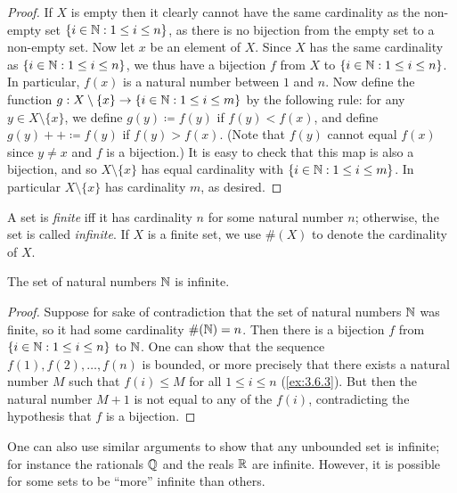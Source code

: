 \begin{proof}
  If \(X\) is empty then it clearly cannot have the same cardinality as the non-empty set \(\{i \in \mathbb{N} : 1 \leq i \leq n\}\), as there is no bijection from the empty set to a non-empty set.
  Now let \(x\) be an element of \(X\).
  Since \(X\) has the same cardinality as \(\{i \in \mathbb{N} : 1 \leq i \leq n\}\), we thus have a bijection \(f\) from \(X\) to \(\{i \in \mathbb{N} : 1 \leq i \leq n\}\).
  In particular, \(f(x)\) is a natural number between \(1\) and \(n\).
  Now define the function \(g : X \setminus \{x\} \to \{i \in \mathbb{N} : 1 \leq i \leq m\}\) by the following rule: for any \(y \in X \setminus \{x\}\), we define \(g(y) \coloneqq f(y)\) if \(f(y) < f(x)\), and define \(g(y)++ \coloneqq f(y)\) if \(f(y) > f(x)\).
  (Note that \(f(y)\) cannot equal \(f(x)\) since \(y \neq x\) and \(f\) is a bijection.)
  It is easy to check that this map is also a bijection, and so \(X \setminus \{x\}\) has equal cardinality with \(\{i \in \mathbb{N} : 1 \leq i \leq m\}\).
  In particular \(X \setminus \{x\}\) has cardinality \(m\), as desired.
\end{proof}

\begin{defn}\label{3.6.10}
  A set is \emph{finite} iff it has cardinality \(n\) for some natural number \(n\);
  otherwise, the set is called \emph{infinite}.
  If \(X\) is a finite set, we use \(\#(X)\) to denote the cardinality of \(X\).
\end{defn}

\setcounter{thm}{11}
\begin{thm}\label{3.6.12}
  The set of natural numbers \(\mathbb{N}\) is infinite.
\end{thm}

\begin{proof}
  Suppose for sake of contradiction that the set of natural numbers \(\mathbb{N}\) was finite, so it had some cardinality \(\#(\mathbb{N}) = n\).
  Then there is a bijection \(f\) from \(\{i \in \mathbb{N} : 1 \leq i \leq n\}\) to \(\mathbb{N}\).
  One can show that the sequence \(f(1), f(2), \dots, f(n)\) is bounded, or more precisely that there exists a natural number \(M\) such that \(f(i) \leq M\) for all \(1 \leq i \leq n\) (\cref{ex:3.6.3}).
  But then the natural number \(M+1\) is not equal to any of the \(f(i)\), contradicting the hypothesis that \(f\) is a bijection.
\end{proof}

\begin{rmk}\label{3.6.13}
  One can also use similar arguments to show that any unbounded set is infinite;
  for instance the rationals \(\mathbb{Q}\) and the reals \(\mathbb{R}\) are infinite.
  However, it is possible for some sets to be ``more'' infinite than others.
\end{rmk}

